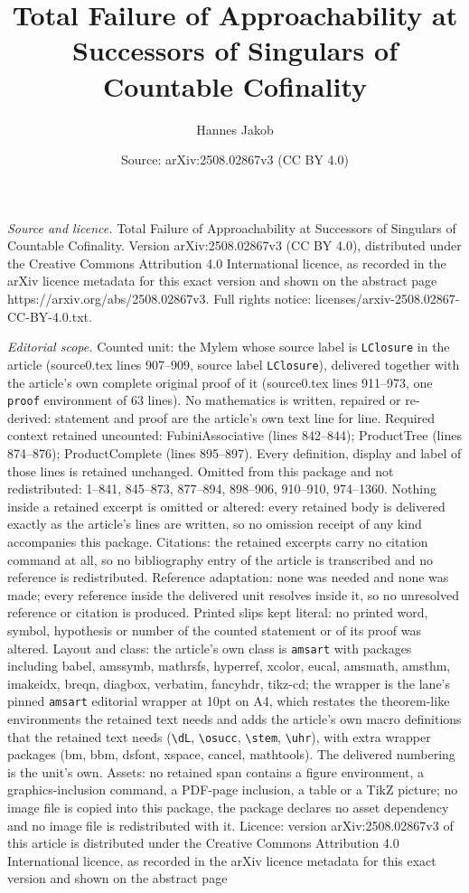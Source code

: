 \documentclass[10pt,a4paper]{amsart}
\title[Total Failure of Approachability at Successors of Singulars ]{Total Failure of Approachability at Successors of Singulars of Countable Cofinality}
\author{Hannes Jakob}
\date{Source: arXiv:2508.02867v3 (CC BY 4.0)}
\begin{document}
\maketitle

\noindent\emph{Source and licence.} Total Failure of Approachability at Successors of Singulars of Countable Cofinality. Version arXiv:2508.02867v3 (CC BY 4.0), distributed under the Creative Commons Attribution 4.0 International licence, as recorded in the arXiv licence metadata for this exact version and shown on the abstract page https://arxiv.org/abs/2508.02867v3. Full rights notice: licenses/arxiv-2508.02867-CC-BY-4.0.txt.\par\smallskip

\noindent\textit{Editorial scope.} Counted unit: the Mylem whose source label is \texttt{LClosure} in the article (source0.tex lines 907--909, source label \texttt{LClosure}), delivered together with the article's own complete original proof of it (source0.tex lines 911--973, one \texttt{proof} environment of 63 lines). No mathematics is written, repaired or re-derived: statement and proof are the article's own text line for line. Required context retained uncounted: FubiniAssociative (lines 842--844); ProductTree (lines 874--876); ProductComplete (lines 895--897). Every definition, display and label of those lines is retained unchanged. Omitted from this package and not redistributed: 1--841, 845--873, 877--894, 898--906, 910--910, 974--1360. Nothing inside a retained excerpt is omitted or altered: every retained body is delivered exactly as the article's lines are written, so no omission receipt of any kind accompanies this package. Citations: the retained excerpts carry no citation command at all, so no bibliography entry of the article is transcribed and no reference is redistributed. Reference adaptation: none was needed and none was made; every reference inside the delivered unit resolves inside it, so no unresolved reference or citation is produced. Printed slips kept literal: no printed word, symbol, hypothesis or number of the counted statement or of its proof was altered. Layout and class: the article's own class is \texttt{amsart} with packages including babel, amssymb, mathrsfs, hyperref, xcolor, eucal, amsmath, amsthm, imakeidx, breqn, diagbox, verbatim, fancyhdr, tikz-cd; the wrapper is the lane's pinned \texttt{amsart} editorial wrapper at 10pt on A4, which restates the theorem-like environments the retained text needs and adds the article's own macro definitions that the retained text needs (\texttt{\textbackslash dL}, \texttt{\textbackslash osucc}, \texttt{\textbackslash stem}, \texttt{\textbackslash uhr}), with extra wrapper packages (bm, bbm, dsfont, xspace, cancel, mathtools). The delivered numbering is the unit's own. Assets: no retained span contains a figure environment, a graphics-inclusion command, a PDF-page inclusion, a table or a TikZ picture; no image file is copied into this package, the package declares no asset dependency and no image file is redistributed with it. Licence: version arXiv:2508.02867v3 of this article is distributed under the Creative Commons Attribution 4.0 International licence, as recorded in the arXiv licence metadata for this exact version and shown on the abstract page 
\end{document}
